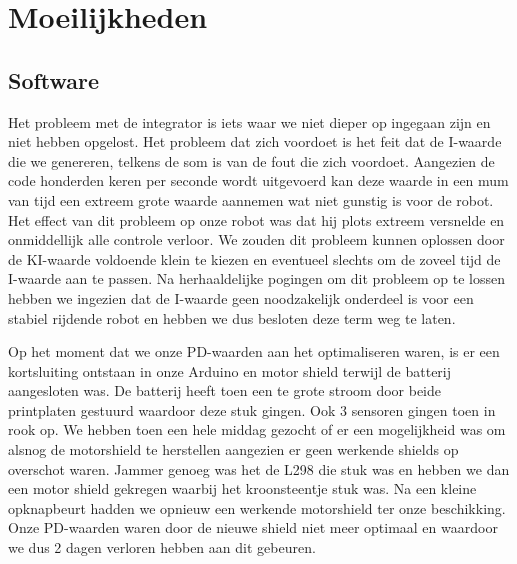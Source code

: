 \chapter{Moeilijkheden}\label{Moeilijkheden}
\section{Software}
Het probleem met de integrator is iets waar we niet dieper op ingegaan zijn en niet hebben opgelost. Het probleem dat zich voordoet is het feit dat de I-waarde die we genereren, telkens de som is van de fout die zich voordoet. Aangezien de code honderden keren per seconde wordt uitgevoerd kan deze waarde in een mum van tijd een extreem grote waarde aannemen wat niet gunstig is voor de robot. Het effect van dit probleem op onze robot was dat hij plots extreem versnelde en onmiddellijk alle controle verloor. We zouden dit probleem kunnen oplossen door de KI-waarde voldoende klein te kiezen en eventueel slechts om de zoveel tijd de I-waarde aan te passen. Na herhaaldelijke pogingen om dit probleem op te lossen hebben we ingezien dat de I-waarde geen noodzakelijk onderdeel is voor een stabiel rijdende robot en hebben we dus besloten deze term weg te laten.

Op het moment dat we onze PD-waarden aan het optimaliseren waren, is er een kortsluiting ontstaan in onze Arduino en motor shield terwijl de batterij aangesloten was. De batterij heeft toen een te grote stroom door beide printplaten gestuurd waardoor deze stuk gingen. Ook 3 sensoren gingen toen in rook op. We hebben toen een hele middag gezocht of er een mogelijkheid was om alsnog de motorshield te herstellen aangezien er geen werkende shields op overschot waren. Jammer genoeg was het de L298 die stuk was en hebben we dan een motor shield gekregen waarbij het kroonsteentje stuk was. Na een kleine opknapbeurt hadden we opnieuw een werkende motorshield ter onze beschikking. Onze PD-waarden waren door de nieuwe shield niet meer optimaal en waardoor we dus 2 dagen verloren hebben aan dit gebeuren.

